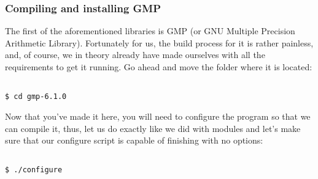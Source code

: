 \documentclass[]{article}
\begin{document}
                                                                                                                                                \subsubsection{Compiling and installing GMP}
                                                                                                                                                The first of the aforementioned libraries is GMP (or GNU Multiple Precision Arithmetic Library). Fortunately for us, the build process 
                                                                                                                                                for it is rather painless, and, of course, we in theory already have made ourselves with all the requirements to get it running. Go 
                                                                                                                                                ahead and move the folder where it is located:
                                                                                                                                                \begin{lstlisting}
                                                                                                                                                $ cd gmp-6.1.0
                                                                                                                                                \end{lstlisting}
                                                                                                                                                Now that you've made it here, you will need to configure the program so that we can compile it, thus, let us do exactly like we did with
                                                                                                                                                modules and let's make sure that our configure script is capable of finishing with no options:
                                                                                                                                                \begin{lstlisting}
                                                                                                                                                $ ./configure
                                                                                                                                                \end{lstlisting}
\end{document}

